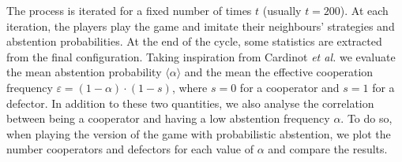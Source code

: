 \documentclass[12pt,oneside,a4paper,fleqn]{article}
\begin{document}
The process is iterated for a fixed number of times $t$ (usually $t=200$). At each iteration, the players play the game and imitate their neighbours' strategies and abstention probabilities. At the end of the cycle, some statistics are extracted from the final configuration. Taking inspiration from Cardinot \emph{et al.} \cite{cardinot2018} we evaluate the mean abstention probability $\langle \alpha \rangle$ and the mean the effective cooperation frequency $\varepsilon = (1-\alpha)\cdot (1-s)$, where $s = 0$ for a cooperator and $s=1$ for a defector. In addition to these two quantities, we also analyse the correlation between being a cooperator and having a low abstention frequency $\alpha$. To do so, when playing the version of the game with probabilistic abstention, we plot the number cooperators and defectors for each value of $\alpha$ and compare the results.
\end{document}
